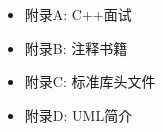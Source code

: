 \begin{itemize}
\item
附录A: C++面试

\item
附录B: 注释书籍

\item
附录C: 标准库头文件

\item
附录D: UML简介
\end{itemize}
